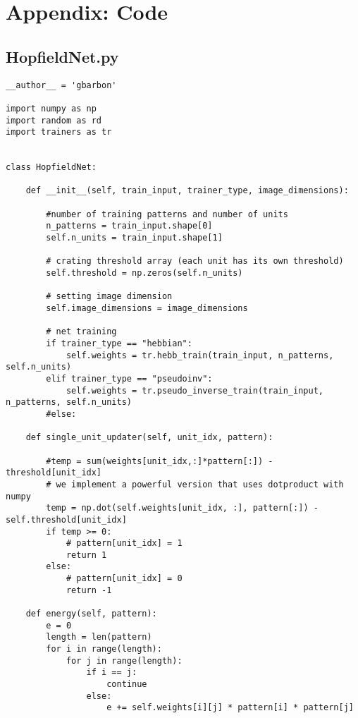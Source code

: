 \documentclass[letterpaper,twocolumn,10pt]{article}
\begin{document}
\onecolumn
\appendix
\label{app:appendixA}
\lstset{basicstyle=\small,style=myCustomMatlabStyle}
\section{Appendix: Code}

\subsection{HopfieldNet.py}
\begin{lstlisting}
__author__ = 'gbarbon'

import numpy as np
import random as rd
import trainers as tr


class HopfieldNet:

    def __init__(self, train_input, trainer_type, image_dimensions):

        #number of training patterns and number of units
        n_patterns = train_input.shape[0]
        self.n_units = train_input.shape[1]

        # crating threshold array (each unit has its own threshold)
        self.threshold = np.zeros(self.n_units)

        # setting image dimension
        self.image_dimensions = image_dimensions

        # net training
        if trainer_type == "hebbian":
            self.weights = tr.hebb_train(train_input, n_patterns, self.n_units)
        elif trainer_type == "pseudoinv":
            self.weights = tr.pseudo_inverse_train(train_input, n_patterns, self.n_units)
        #else:

    def single_unit_updater(self, unit_idx, pattern):

        #temp = sum(weights[unit_idx,:]*pattern[:]) - threshold[unit_idx]
        # we implement a powerful version that uses dotproduct with numpy
        temp = np.dot(self.weights[unit_idx, :], pattern[:]) - self.threshold[unit_idx]
        if temp >= 0:
            # pattern[unit_idx] = 1
            return 1
        else:
            # pattern[unit_idx] = 0
            return -1

    def energy(self, pattern):
        e = 0
        length = len(pattern)
        for i in range(length):
            for j in range(length):
                if i == j:
                    continue
                else:
                    e += self.weights[i][j] * pattern[i] * pattern[j]


\end{lstlisting}
\end{document}
